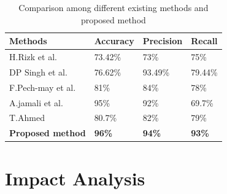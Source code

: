 \begin{table}[htbp]
\centering
\captionsetup{font=small} %
\caption{Comparison among different existing methods and proposed method}
\label{tab:pretrained-models}
\normalsize %
\begin{tabular}{|p{4cm}|p{2cm}|p{1.9cm}|p{2cm}|} %
\hline
\textbf{Methods} & \textbf{Accuracy} & \textbf{Precision} & \textbf{Recall}\\ \hline
H.Rizk et al.\cite{per2} & 73.42\% & 73\% & 75\%\\
DP Singh et al.\cite{per3} & 76.62\% & 93.49\% & 79.44\%\\
F.Pech-may et al.\cite{per4} & 81\% & 84\% & 78\%\\
A.jamali et al.\cite{per6} & 95\% & 92\% & 69.7\%\\
T.Ahmed \cite{per5} & 80.7\% & 82\% & 79\%\\
\textbf{Proposed method} & \textbf{96\%} & \textbf{94\%} & \textbf{93\%} \\ \hline

\end{tabular}
\end{table}




\section{Impact Analysis }


